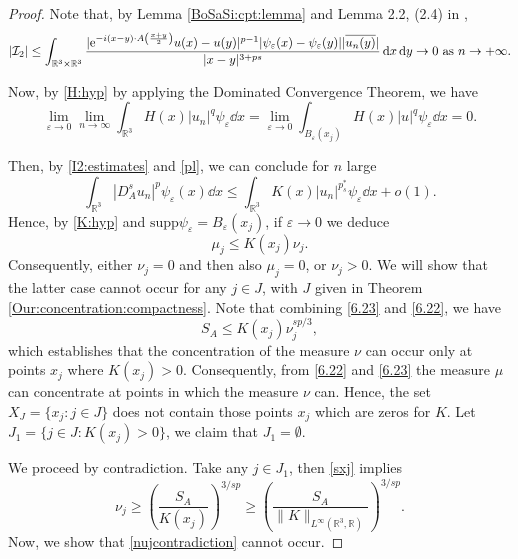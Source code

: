 \documentclass[leqno,11pt]{amsart}
\newcommand{\R}{\mathbb R}
\newcommand{\cI}{{\mathcal I}}
\newcommand{\eps}{\varepsilon}
\numberwithin{equation}{section}
\def\e{{\rm e}}
\newcommand{\expAminus}{\e^{-i(x-y)\cdot A\left(\frac{x+y}{2}\right)}}
\begin{document}
\begin{proof}
Note that, by Lemma \ref{BoSaSi:cpt:lemma} and Lemma 2.2, (2.4) in \cite{BonderSaintierSilva}, 
\begin{equation}
\label{I2:estimates}
    |\cI_2|\le \int_{\R^3\times \R^3}\frac{|\expAminus u(x) - u(y)|^{p-1}|\psi_\eps(x)-\psi_\eps(y)| |\overline{u_n(y)}|}{|x-y|^{3+ps}} \dd x \dd y \to 0 \text{ as } n \to +\infty.
\end{equation}

Now, by \eqref{H:hyp} by applying the Dominated Convergence Theorem, we have
\begin{equation}\label{pl}
\lim_{\eps\to 0}\lim_{n\to\infty}\int_{\R^3}H(x)|u_n|^q\psi_\eps  \dd x=\lim_{\eps\to 0}\int_{B_\eps(x_j)}H(x)|u|^q\psi_\eps  \dd x=0.
\end{equation}





Then, by \eqref{I2:estimates} and \eqref{pl}, we can conclude for $n$ large
\begin{equation}\label{nabla_le_K_ustar}
    \int_{\R^3}|D^s_A u_n|^p\psi_\eps(x) \dd x
    \le \int_{\R^3}K(x)|u_n|^{p^*_s}\psi_\eps \dd x+o(1).
\end{equation}
Hence, by \eqref{K:hyp} and $\mbox{supp} \psi_\eps=B_\eps(x_j)$, if $\eps\to0$ we deduce
\begin{equation}\label{6.23}
\mu_{j}\le  K(x_{j})\nu_{j}.
\end{equation}
Consequently, either  $\nu_j=0$ and then also $\mu_j=0$,  or $\nu_j>0$. We will show that  
the latter case cannot occur for any $j\in J$, with $J$ given in Theorem \ref{Our:concentration:compactness}. Note that combining \eqref{6.23} and \eqref{6.22}, we have
\begin{equation}\label{sxj}
S_A\leq  K(x_j)\nu_j^{sp/3},
\end{equation}
which establishes that the concentration of the measure $\nu$ can occur only at points $x_j$ where $K(x_j)>0$.
Consequently, from \eqref{6.22} and \eqref{6.23} the measure $\mu$ can concentrate at points
in which the measure $\nu$ can.
Hence, the set $X_J=\{x_j: j\in J\}$  does not contain those points $x_{j}$ which are zeros for $K$. Let $J_1=\{j\in J: K(x_j)>0\}$, we claim that $J_1=\emptyset$. 

We proceed by contradiction. Take any $j\in J_1$, then \eqref{sxj} implies
\begin{equation}\label{nujcontradiction}
 \nu_{j}\ge \left( \frac{S_A}{ K(x_{j})}\right)^{3/sp}\ge \left( \frac{S_A}{\|K\|_{L^\infty(\R^3,\R)}}\right)^{3/sp}.
\end{equation}
Now, we show that \eqref{nujcontradiction} cannot occur. 


\end{proof}
\end{document}

